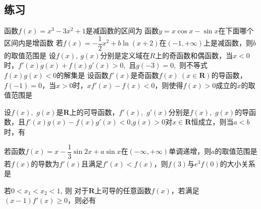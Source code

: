 \subsection{练习}
\begin{questions}
\qs 函数$f(x)=x^3-3x^2+1$是减函数的区间为\xx
{}
\qs 函数$ y=x\cos x-\sin x $在下面哪个区间内是增函数\xx
{}
\qs 若$f(x)=-\dfrac{1}{2}x^2+b\ln (x+2)$在$(-1,+\infty)$上是减函数，则$ b $的取值范围是\xx
{}
\qs 设$f(x),~g(x)$分别是定义域在$ R $上的奇函数和偶函数，当$ x<0 $时，$ f'(x)g(x)+f(x)g'(x) >0$,~且$ g(-3)=0 $,~则不等式$ f(x)g(x)<0 $的解集是\xx
{}
\question
设函数$f'(x)$是奇函数$f(x)~(x\in \mathbf{R})$的导函数，$f(-1)=0$，当$x>0$时，$xf'(x)-f(x)<0$，则使得$f(x)>0$成立的$x$的取值范围是\xx
{}

\question
设$f(x)$,~$g(x)$是$\mathbf{R}$上的可导函数，$f'(x)$,~$g'(x)$分别是$f(x)$,~$g(x)$的导函数，且$f'(x)g(x)-f(x)g'(x)<0$,$g(x)>0$对$x\in\mathbf{R}$恒成立，则当$a<b$时，有\xx

\question
若函数$f(x)=x-\dfrac{1}{3}\sin 2x+a\sin x$在$(-\infty,+\infty)$单调递增，则$a$的取值范围是\xx
{}
\question
若$f(x)$的导数为$f'(x)$且满足$f'(x)<f(x)$，则$f(3)$与$e^3f(0)$的大小关系是\xx
{}

\qs 若$ 0<x_1<x_2<1,~ $则\xx
{}
\qs 对于$ \mathbf{R} $上可导的任意函数$f(x)$，若满足$ (x-1)f'(x)\ge 0 $，则必有\xx
{}


\end{questions}

